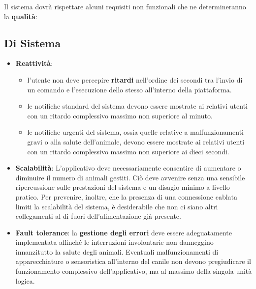     Il sistema dovrà rispettare alcuni requisiti non funzionali che ne determineranno la \textbf{qualità}:
        \subsection{Di Sistema}
            \begin{itemize}
            \item \textbf{Reattività}: 
            \begin{itemize}
                \item l'utente non deve percepire \textbf{ritardi} nell'ordine dei secondi tra l'invio di un comando e l'esecuzione dello stesso all'interno della piattaforma. 
                \item le notifiche standard del sistema devono essere mostrate ai relativi utenti con un ritardo complessivo massimo non superiore al minuto.
                \item le notifiche urgenti del sistema, ossia quelle relative a malfunzionamenti gravi o alla salute dell'animale, devono essere mostrate ai relativi utenti con un ritardo complessivo massimo non superiore ai dieci secondi.
            \end{itemize}
            
            \item \textbf{Scalabilità}: L'applicativo deve necessariamente consentire di aumentare o diminuire il numero di animali gestiti. Ciò deve avvenire senza una sensibile ripercussione sulle prestazioni del sistema e un disagio minimo a livello pratico. Per prevenire, inoltre, che la presenza di una connessione cablata limiti la scalabilità del sistema, è desiderabile che non ci siano altri collegamenti al di fuori dell'alimentazione già presente. 
            
            \item \textbf{Fault tolerance}: la \textbf{gestione degli errori} deve essere adeguatamente implementata affinché le interruzioni involontarie non danneggino innanzitutto la salute degli animali.
            Eventuali malfunzionamenti di apparecchiature o sensoristica all'interno del canile non devono pregiudicare il funzionamento complessivo dell'applicativo, ma al massimo della singola unità logica. 
    \end{itemize}
        
